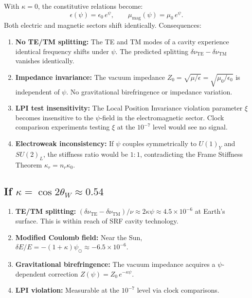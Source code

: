 \documentclass[aps,prd,twocolumn,superscriptaddress,nofootinbib]{revtex4-2}
\begin{document}
With $\kappa = 0$, the constitutive relations become:
\begin{equation}
\epsilon(\psi) = \epsilon_0\, e^\psi, \qquad
\mu_{\mathrm{mag}}(\psi) = \mu_0\, e^\psi.
\end{equation}
Both electric and magnetic sectors shift identically.  Consequences:
\begin{enumerate}
\item \textbf{No TE/TM splitting:} The TE and TM modes of a cavity
experience identical frequency shifts under $\psi$.  The predicted
splitting $\delta\nu_{\mathrm{TE}} - \delta\nu_{\mathrm{TM}}$
vanishes identically.

\item \textbf{Impedance invariance:} The vacuum impedance
$Z_0 = \sqrt{\mu/\epsilon} = \sqrt{\mu_0/\epsilon_0}$ is independent
of $\psi$.  No gravitational birefringence or impedance variation.

\item \textbf{LPI test insensitivity:} The Local Position Invariance
violation parameter $\xi$ becomes insensitive to the $\psi$-field
in the electromagnetic sector.  Clock comparison experiments testing
$\xi$ at the $10^{-7}$ level would see no signal.

\item \textbf{Electroweak inconsistency:} If $\psi$ couples
symmetrically to $U(1)_Y$ and $SU(2)_L$, the stiffness ratio would
be $1:1$, contradicting the Frame Stiffness Theorem $\kappa_r = n_r \kappa_0$.
\end{enumerate}

\subsection{If $\kappa = \cos 2\theta_W \approx 0.54$}

\begin{enumerate}
\item \textbf{TE/TM splitting:}
$(\delta\nu_{\mathrm{TE}} - \delta\nu_{\mathrm{TM}})/\nu
\approx 2\kappa\psi \approx 4.5 \times 10^{-6}$
at Earth's surface.  This is within reach of SRF cavity technology.

\item \textbf{Modified Coulomb field:} Near the Sun,
$\delta E/E = -(1+\kappa)\psi_\odot \approx -6.5 \times 10^{-6}$.

\item \textbf{Gravitational birefringence:} The vacuum impedance
acquires a $\psi$-dependent correction
$Z(\psi) = Z_0\, e^{-\kappa\psi}$.

\item \textbf{LPI violation:} Measurable at the $10^{-7}$ level
via clock comparisons.
\end{enumerate}
\end{document}
